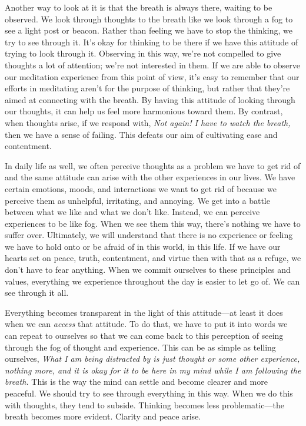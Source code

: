Another way to look at it is that the breath is always there, waiting 
to be observed. We look through thoughts to the breath like we look 
through a fog to see a light post or beacon. Rather than feeling we 
have to stop the thinking, we try to see through it. It's okay for 
thinking to be there if we have this attitude of trying to look through 
it. Observing in this way, we're not compelled to give thoughts a lot 
of attention; we're not interested in them. If we are able to observe 
our meditation experience from this point of view, it's easy to 
remember that our efforts in meditating aren't for the purpose of 
thinking, but rather that they're aimed at connecting with the breath. 
By having this attitude of looking through our thoughts, it can help us 
feel more harmonious toward them. By contrast, when thoughts arise, if 
we respond with, \emph{Not again! I have to watch the breath,} then we 
have a sense of failing. This defeats our aim of cultivating ease and 
contentment.

In daily life as well, we often perceive thoughts as a problem we have 
to get rid of and the same attitude can arise with the other 
experiences in our lives. We have certain emotions, moods, and 
interactions we want to get rid of because we perceive them as 
unhelpful, irritating, and annoying. We get into a battle between what 
we like and what we don't like. Instead, we can perceive experiences to 
be like fog. When we see them this way, there's nothing we have to 
suffer over. Ultimately, we will understand that there is no experience 
or feeling we have to hold onto or be afraid of in this world, in this 
life. If we have our hearts set on peace, truth, contentment, and 
virtue then with that as a refuge, we don't have to fear anything. When 
we commit ourselves to these principles and values, everything we 
experience throughout the day is easier to let go of. We can see 
through it all.

Everything becomes transparent in the light of this attitude---at least 
it does when we can \emph{access} that attitude. To do that, we have to 
put it into words we can repeat to ourselves so that we can come back 
to this perception of seeing through the fog of thought and experience. 
This can be as simple as telling ourselves, \emph{What I am being 
distracted by is just thought or some other experience, nothing more, 
and it is okay for it to be here in my mind while I am following the 
breath.} This is the way the mind can settle and become clearer and 
more peaceful. We should try to see through everything in this way. 
When we do this with thoughts, they tend to subside. Thinking becomes 
less problematic---the breath becomes more evident. Clarity and peace 
arise.

